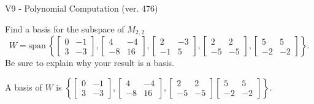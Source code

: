 \begin{exercise}
  \begin{exerciseTitle}V9 - Polynomial Computation (ver. 476)\end{exerciseTitle}
  \begin{exerciseStatement}
    Find a basis for the subspace of \(M_{2,2}\) 
\[W=\mathrm{span}\ \left\{\left[\begin{array}{cc}
0 & -1 \\
3 & -3
\end{array}\right] , \left[\begin{array}{cc}
4 & -4 \\
-8 & 16
\end{array}\right] , \left[\begin{array}{cc}
2 & -3 \\
-1 & 5
\end{array}\right] , \left[\begin{array}{cc}
2 & 2 \\
-5 & -5
\end{array}\right] , \left[\begin{array}{cc}
5 & 5 \\
-2 & -2
\end{array}\right]\right\}.\]
 Be sure to explain why your result is a basis.


  \end{exerciseStatement}
  \begin{exerciseAnswer}
   A basis of \(W\) is  \(\left\{\left[\begin{array}{cc}
0 & -1 \\
3 & -3
\end{array}\right] , \left[\begin{array}{cc}
4 & -4 \\
-8 & 16
\end{array}\right] , \left[\begin{array}{cc}
2 & 2 \\
-5 & -5
\end{array}\right] \left[\begin{array}{cc}
5 & 5 \\
-2 & -2
\end{array}\right]\right\}\).
  


  \end{exerciseAnswer}
\end{exercise}